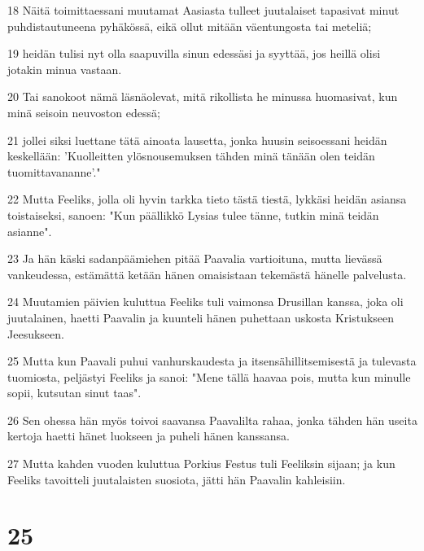 \par 18 Näitä toimittaessani muutamat Aasiasta tulleet juutalaiset tapasivat minut puhdistautuneena pyhäkössä, eikä ollut mitään väentungosta tai meteliä;
\par 19 heidän tulisi nyt olla saapuvilla sinun edessäsi ja syyttää, jos heillä olisi jotakin minua vastaan.
\par 20 Tai sanokoot nämä läsnäolevat, mitä rikollista he minussa huomasivat, kun minä seisoin neuvoston edessä;
\par 21 jollei siksi luettane tätä ainoata lausetta, jonka huusin seisoessani heidän keskellään: 'Kuolleitten ylösnousemuksen tähden minä tänään olen teidän tuomittavananne'."
\par 22 Mutta Feeliks, jolla oli hyvin tarkka tieto tästä tiestä, lykkäsi heidän asiansa toistaiseksi, sanoen: "Kun päällikkö Lysias tulee tänne, tutkin minä teidän asianne".
\par 23 Ja hän käski sadanpäämiehen pitää Paavalia vartioituna, mutta lievässä vankeudessa, estämättä ketään hänen omaisistaan tekemästä hänelle palvelusta.
\par 24 Muutamien päivien kuluttua Feeliks tuli vaimonsa Drusillan kanssa, joka oli juutalainen, haetti Paavalin ja kuunteli hänen puhettaan uskosta Kristukseen Jeesukseen.
\par 25 Mutta kun Paavali puhui vanhurskaudesta ja itsensähillitsemisestä ja tulevasta tuomiosta, peljästyi Feeliks ja sanoi: "Mene tällä haavaa pois, mutta kun minulle sopii, kutsutan sinut taas".
\par 26 Sen ohessa hän myös toivoi saavansa Paavalilta rahaa, jonka tähden hän useita kertoja haetti hänet luokseen ja puheli hänen kanssansa.
\par 27 Mutta kahden vuoden kuluttua Porkius Festus tuli Feeliksin sijaan; ja kun Feeliks tavoitteli juutalaisten suosiota, jätti hän Paavalin kahleisiin.

\chapter{25}

